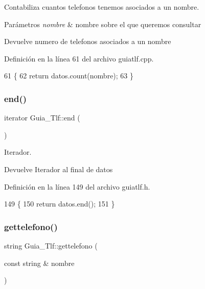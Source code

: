 Contabiliza cuantos telefonos tenemos asociados a un nombre. 


\begin{DoxyParams}{Parámetros}
{\em nombre} & nombre sobre el que queremos consultar \\
\hline
\end{DoxyParams}
\begin{DoxyReturn}{Devuelve}
numero de telefonos asociados a un nombre 
\end{DoxyReturn}


Definición en la línea 61 del archivo guiatlf.\+cpp.


\begin{DoxyCode}
61                                                        \{
62     \textcolor{keywordflow}{return} datos.count(nombre);
63 \}
\end{DoxyCode}
\mbox{\label{classGuia__Tlf_a91777ba1c5e206259943af1eae5aa305}} 
\subsubsection{\texorpdfstring{end()}{end()}}
{\footnotesize\ttfamily iterator Guia\+\_\+\+Tlf\+::end (\begin{DoxyParamCaption}{ }\end{DoxyParamCaption})\hspace{0.3cm}{\ttfamily [inline]}}



Iterador. 

\begin{DoxyReturn}{Devuelve}
Iterador al final de datos 
\end{DoxyReturn}


Definición en la línea 149 del archivo guiatlf.\+h.


\begin{DoxyCode}
149                   \{
150         \textcolor{keywordflow}{return} datos.end();
151     \}
\end{DoxyCode}
\mbox{\label{classGuia__Tlf_a18593e3cf273db1a540cba69f87fd637}} 
\subsubsection{\texorpdfstring{gettelefono()}{gettelefono()}}
{\footnotesize\ttfamily string Guia\+\_\+\+Tlf\+::gettelefono (\begin{DoxyParamCaption}\item[{const string \&}]{nombre }\end{DoxyParamCaption})}



